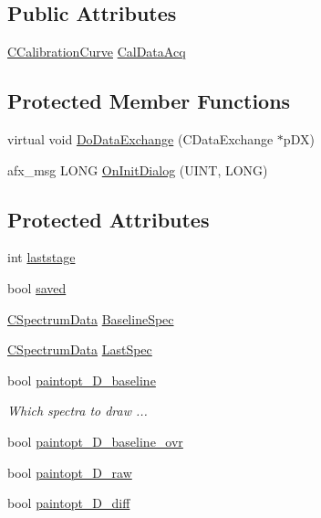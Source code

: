 \subsection*{Public Attributes}
\begin{DoxyCompactItemize}
\item 
\hyperlink{classCCalibrationCurve}{CCalibrationCurve} \hyperlink{classCDlgBarAcq_ac6d303123cbc7b900334a1f7d59c27f0}{CalDataAcq}
\end{DoxyCompactItemize}
\subsection*{Protected Member Functions}
\begin{DoxyCompactItemize}
\item 
virtual void \hyperlink{classCDlgBarAcq_a169fcd0a36acd4774eed38ca71833acf}{DoDataExchange} (CDataExchange $\ast$pDX)
\item 
afx\_\-msg LONG \hyperlink{classCDlgBarAcq_a7c8da5203e89a803d81d7c26fbec1ced}{OnInitDialog} (UINT, LONG)
\end{DoxyCompactItemize}
\subsection*{Protected Attributes}
\begin{DoxyCompactItemize}
\item 
int \hyperlink{classCDlgBarAcq_a5c87f97e5ce4ceca97d2d14eb95e0d02}{laststage}
\item 
bool \hyperlink{classCDlgBarAcq_a75183d3a82a56dd75349d200f3ef00d4}{saved}
\item 
\hyperlink{classCSpectrumData}{CSpectrumData} \hyperlink{classCDlgBarAcq_aa73a67e05483890dd9f82c49bb5d8746}{BaselineSpec}
\item 
\hyperlink{classCSpectrumData}{CSpectrumData} \hyperlink{classCDlgBarAcq_aa479265b10dece2fb301894efddce881}{LastSpec}
\item 
bool \hyperlink{classCDlgBarAcq_a18dbcf04939bfc600a27898d7f470263}{paintopt\_\-D\_\-baseline}
\begin{DoxyCompactList}\small\item\em Which spectra to draw ... \item\end{DoxyCompactList}\item 
bool \hyperlink{classCDlgBarAcq_afdee9e19c60ee22b8464cebc7685b573}{paintopt\_\-D\_\-baseline\_\-ovr}
\item 
bool \hyperlink{classCDlgBarAcq_a975c3cd2e0dfb9c7dc4ac41c36d20525}{paintopt\_\-D\_\-raw}
\item 
bool \hyperlink{classCDlgBarAcq_ac7f914a7e5f6dfc66404db04c237929d}{paintopt\_\-D\_\-diff}
\end{DoxyCompactItemize}



